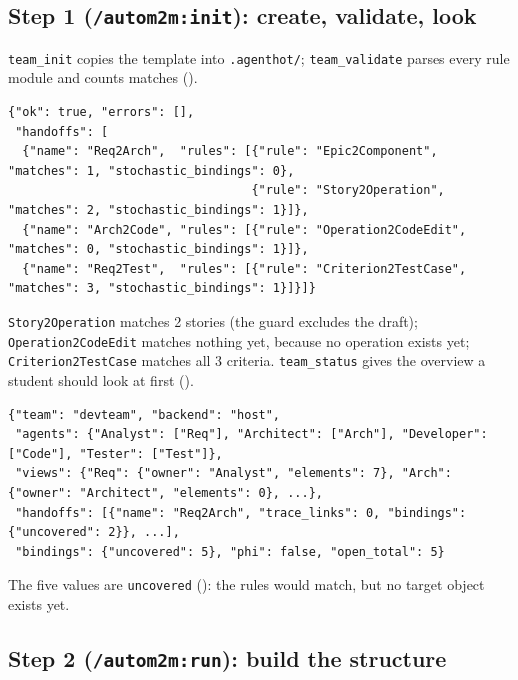 \documentclass[10pt,a4paper]{article}
\newcommand{\code}[1]{\texttt{#1}}
\newcommand{\file}[1]{\texttt{#1}}
\newcommand{\mcptool}[1]{\texttt{#1}}
\newcommand{\skill}[1]{\texttt{/autom2m:#1}}
\begin{document}
\subsection{Step 1 (\skill{init}): create, validate, look}

\mcptool{team\_init} copies the template into \file{.agenthot/};
\mcptool{team\_validate} parses every rule module and counts matches
().

\begin{lstlisting}[style=engine, caption={Observed: \code{team\_validate} on the fresh workspace (abridged).}, label={lst:w1validate}]
{"ok": true, "errors": [],
 "handoffs": [
  {"name": "Req2Arch",  "rules": [{"rule": "Epic2Component",     "matches": 1, "stochastic_bindings": 0},
                                  {"rule": "Story2Operation",    "matches": 2, "stochastic_bindings": 1}]},
  {"name": "Arch2Code", "rules": [{"rule": "Operation2CodeEdit", "matches": 0, "stochastic_bindings": 1}]},
  {"name": "Req2Test",  "rules": [{"rule": "Criterion2TestCase", "matches": 3, "stochastic_bindings": 1}]}]}
\end{lstlisting}

\code{Story2Operation} matches 2 stories (the guard excludes the draft);
\code{Operation2CodeEdit} matches nothing yet, because no operation exists
yet; \code{Criterion2TestCase} matches all 3 criteria. \mcptool{team\_status}
gives the overview a student should look at first ().

\begin{lstlisting}[style=engine, caption={Observed: \code{team\_status} before the first run (abridged).}, label={lst:w1status}]
{"team": "devteam", "backend": "host",
 "agents": {"Analyst": ["Req"], "Architect": ["Arch"], "Developer": ["Code"], "Tester": ["Test"]},
 "views": {"Req": {"owner": "Analyst", "elements": 7}, "Arch": {"owner": "Architect", "elements": 0}, ...},
 "handoffs": [{"name": "Req2Arch", "trace_links": 0, "bindings": {"uncovered": 2}}, ...],
 "bindings": {"uncovered": 5}, "phi": false, "open_total": 5}
\end{lstlisting}

The five values are \code{uncovered} (): the rules would
match, but no target object exists yet.

\subsection{Step 2 (\skill{run}): build the structure}
\end{document}
